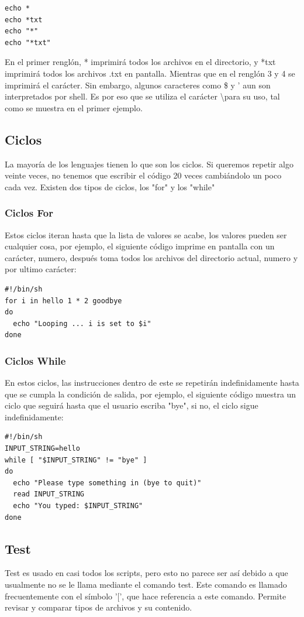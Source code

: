 \documentclass[12pt]{article}
\begin{document}
\begin{verbatim}
echo * 
echo *txt
echo "*" 
echo "*txt"
\end{verbatim}

En el primer renglón, * imprimirá todos los archivos en el directorio, y *txt imprimirá todos los archivos .txt en pantalla. Mientras que en el renglón 3 y 4 se imprimirá el carácter. Sin embargo, algunos caracteres como \$ y ' aun son interpretados por shell. Es por eso que se utiliza el carácter \textbackslash para su uso, tal como se muestra en el primer ejemplo. 

\subsection{Ciclos}
La mayoría de los lenguajes tienen lo que son los ciclos. Si queremos repetir algo veinte veces, no tenemos que escribir el código 20 veces cambiándolo un poco cada vez. Existen dos tipos de ciclos, los "for" y los "while"

\subsubsection{Ciclos For}
Estos ciclos iteran hasta que la lista de valores se acabe, los valores pueden ser cualquier cosa, por ejemplo, el siguiente código imprime en pantalla con un carácter, numero, después toma todos los archivos del directorio actual, numero y por ultimo carácter:

\begin{verbatim}
#!/bin/sh
for i in hello 1 * 2 goodbye 
do
  echo "Looping ... i is set to $i"
done
\end{verbatim}

\subsubsection{Ciclos While}
En estos ciclos, las instrucciones dentro de este se repetirán indefinidamente hasta que se cumpla la condición de salida, por ejemplo, el siguiente código muestra un ciclo que seguirá hasta que el usuario escriba "bye", si no, el ciclo sigue indefinidamente: 

\begin{verbatim}
#!/bin/sh
INPUT_STRING=hello
while [ "$INPUT_STRING" != "bye" ]
do
  echo "Please type something in (bye to quit)"
  read INPUT_STRING
  echo "You typed: $INPUT_STRING"
done
\end{verbatim}

\subsection{Test}
Test es usado en casi todos los scripts, pero esto no parece ser así debido a que usualmente no se le llama mediante el comando test. Este comando es llamado frecuentemente con el símbolo '[', que hace referencia a este comando. Permite revisar y comparar tipos de archivos y su contenido.\\
\end{document}
